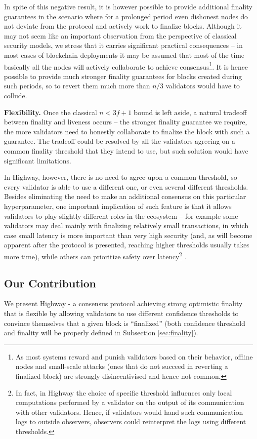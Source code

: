 \documentclass[12pt, fleqn]{article}
\begin{document}
In spite of this negative result, it is however possible to provide additional finality guarantees in the scenario where for a prolonged period even dishonest nodes do not deviate from the protocol and actively work to finalize blocks.
Although it may not seem like an important observation from the perspective of classical security models, we stress that it carries significant practical consequences -- in most cases of blockchain deployments it may be assumed that most of the time basically all the nodes will actively collaborate to achieve consensus\footnote{As most systems reward and punish validators based on their behavior, offline nodes and small-scale attacks (ones that do not succeed in reverting a finalized block) are strongly disincentivised and hence not common.}.
It is hence possible to provide much stronger finality guarantees for blocks created during such periods, so to revert them much more than $n/3$ validators would have to collude.


{\bf Flexibility.}
Once the classical $n<3f+1$ bound is left aside, a natural tradeoff between finality and liveness occurs -- the stronger finality guarantee we require, the more validators need to honestly collaborate to finalize the block with such a guarantee.
The tradeoff could be resolved by all the validators agreeing on a common finality threshold that they intend to use, but such solution would have significant limitations.

In Highway, however, there is no need to agree upon a common threshold, so every validator is able to use a different one, or even several different thresholds.
Besides eliminating the need to make an additional consensus on this particular hyperparameter, one important implication of such feature is that it allows validators to play slightly different roles in the ecosystem -- for example some validators may deal mainly with finalizing relatively small transactions, in which case small latency is more important than very high security (and, as will become apparent after the protocol is presented, reaching higher thresholds usually takes more time), while others can prioritize safety over latency\footnote{In fact, in Highway the choice of specific threshold influences only local computations performed by a validator on the output of its communication with other validators. Hence, if validators would hand such communication logs to outside observers, observers could reinterpret the logs using different thresholds.} .


\subsection{Our Contribution}
We present Highway - a consensus protocol achieving strong optimistic finality that is flexible by allowing validators to use different confidence thresholds to convince themselves that a given block is ``finalized'' (both confidence threshold and finality will be properly defined in Subsection \ref{sec:finality}). 
\end{document}
